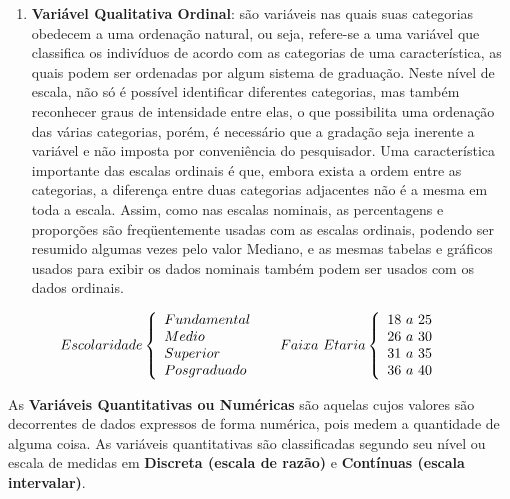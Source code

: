 \begin{enumerate}
\item \textbf{Variável Qualitativa Ordinal}: são variáveis nas quais suas categorias obedecem a uma ordenação natural, ou seja, refere-se a uma variável que classifica os indivíduos de acordo com as categorias de uma característica, as quais podem ser ordenadas por algum sistema de graduação. Neste nível de escala, não só é possível identificar diferentes categorias, mas também reconhecer graus de intensidade entre elas, o que possibilita uma ordenação das várias categorias, porém, é necessário que a gradação seja inerente a variável e não imposta por conveniência do pesquisador. Uma característica importante das escalas ordinais é que, embora exista a ordem entre as categorias, a diferença entre duas categorias adjacentes não é a mesma em toda a escala. Assim, como nas escalas nominais, as percentagens e proporções são freqüentemente usadas com as escalas ordinais, podendo ser resumido algumas vezes pelo valor Mediano, e as mesmas tabelas e gráficos usados para exibir os dados nominais também podem ser usados com os dados ordinais.
\end{enumerate}


$$
    Escolaridade
    \left\{
    \begin{array}{ll}
    Fundamental  & \hbox{ } \\
    Medio        & \hbox{ } \\
    Superior     & \hbox{ } \\
    Posgraduado  & \hbox{ }
    \end{array}
    \right.
    Faixa \ Etaria
    \left\{
    \begin{array}{ll}
    18 \ a \ 25   & \hbox{ } \\
    26 \ a \ 30   & \hbox{ } \\
    31 \ a \ 35   & \hbox{ } \\
    36 \ a \ 40    & \hbox{ }
    \end{array}
    \right.
    $$



As \textbf{Variáveis Quantitativas ou Numéricas} são aquelas cujos valores são de\-cor\-ren\-tes de dados expressos de forma numérica, pois medem a quantidade de alguma coisa. As variáveis quantitativas são classificadas segundo seu nível ou escala de medidas em \textbf{Discreta (escala de razão)} e \textbf{Contínuas (escala intervalar)}.



